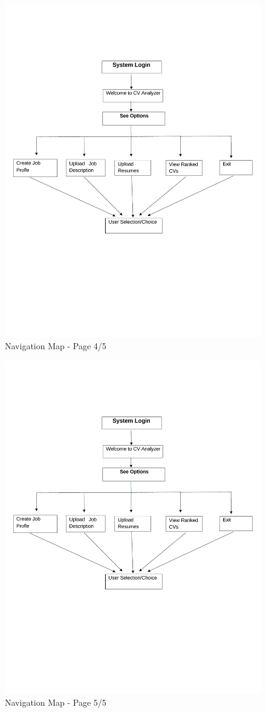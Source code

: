 \begin{figure}[h]
    \centering
    \includegraphics[width=1\linewidth,page=4]{img/diagrams/Updated_Navigation_Map_PDF.pdf}
    \caption{Navigation Map - Page 4/5}
\end{figure}

\begin{figure}[h]
    \centering
    \includegraphics[width=1\linewidth,page=5]{img/diagrams/Updated_Navigation_Map_PDF.pdf}
    \caption{Navigation Map - Page 5/5}
\end{figure}
